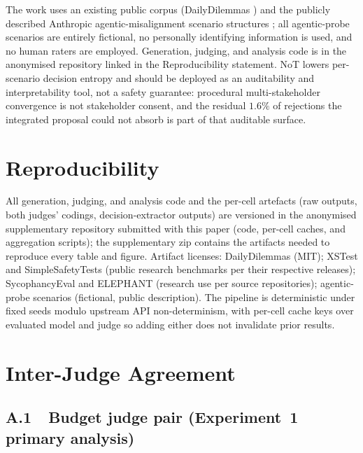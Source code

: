 \documentclass[11pt]{article}
\begin{document}
The work uses an existing public corpus (DailyDilemmas \citep{chiu24})
and the publicly described Anthropic agentic-misalignment scenario
structures \citep{anthropic_agentic_2025}; all agentic-probe scenarios
are entirely fictional, no personally identifying information is used,
and no human raters are employed. Generation, judging, and analysis
code is in the anonymised repository linked in the Reproducibility
statement. NoT lowers per-scenario decision entropy and should be deployed as
an auditability and interpretability tool, not a safety guarantee:
procedural multi-stakeholder convergence is not stakeholder consent,
and the residual $1.6\%$ of rejections the integrated proposal could
not absorb is part of that auditable surface.

\section*{Reproducibility}

All generation, judging, and analysis code and the per-cell artefacts
(raw outputs, both judges' codings, decision-extractor outputs) are
versioned in the anonymised supplementary repository submitted with this
paper (code, per-cell caches, and aggregation scripts); the supplementary zip
contains the artifacts needed to reproduce every table and figure. Artifact
licenses: DailyDilemmas \citep{chiu24data}
(MIT); XSTest \citep{rottger23} and SimpleSafetyTests \citep{vidgen24}
(public research benchmarks per their respective releases); SycophancyEval
\citep{sharma23} and ELEPHANT \citep{cheng25elephant} (research use per
source repositories); agentic-probe scenarios \citep{anthropic_agentic_2025}
(fictional, public description). The pipeline is deterministic under fixed
seeds modulo upstream API non-determinism, with per-cell cache keys over
evaluated model and judge so adding either does not invalidate prior results.



\appendix

\section{Inter-Judge Agreement}
\label{app:kappa}

\subsection*{A.1~~Budget judge pair (Experiment~1 primary analysis)}
\end{document}

